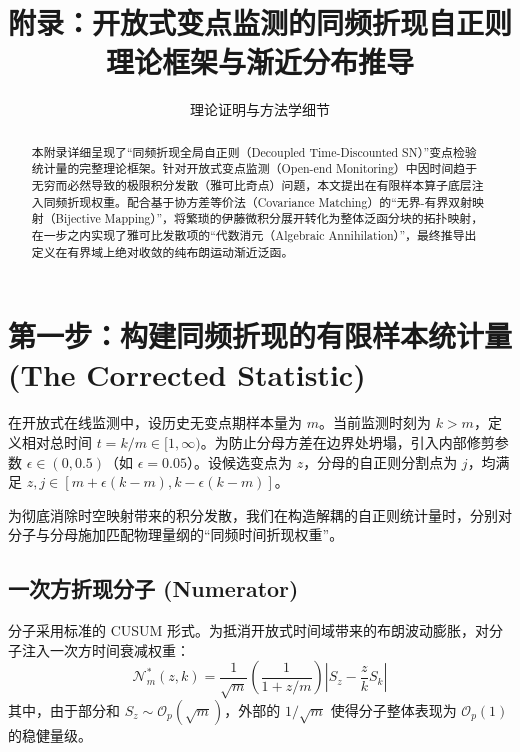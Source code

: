 \documentclass[11pt,a4paper]{article}
\title{\Large \textbf{附录：开放式变点监测的同频折现自正则理论框架与渐近分布推导}}
\author{理论证明与方法学细节}
\date{}
\begin{document}
\maketitle

\begin{abstract}
本附录详细呈现了“同频折现全局自正则（Decoupled Time-Discounted SN）”变点检验统计量的完整理论框架。针对开放式变点监测（Open-end Monitoring）中因时间趋于无穷而必然导致的极限积分发散（雅可比奇点）问题，本文提出在有限样本算子底层注入同频折现权重。配合基于协方差等价法（Covariance Matching）的“无界-有界双射映射（Bijective Mapping）”，将繁琐的伊藤微积分展开转化为整体泛函分块的拓扑映射，在一步之内实现了雅可比发散项的“代数消元（Algebraic Annihilation）”，最终推导出定义在有界域上绝对收敛的纯布朗运动渐近泛函。
\end{abstract}

\vspace{0.5cm}

\section{第一步：构建同频折现的有限样本统计量 (The Corrected Statistic)}

在开放式在线监测中，设历史无变点期样本量为 $m$。当前监测时刻为 $k > m$，定义相对总时间 $t = k/m \in [1, \infty)$。为防止分母方差在边界处坍塌，引入内部修剪参数 $\epsilon \in (0, 0.5)$（如 $\epsilon = 0.05$）。设候选变点为 $z$，分母的自正则分割点为 $j$，均满足 $z, j \in [m + \epsilon(k-m), k - \epsilon(k-m)]$。

为彻底消除时空映射带来的积分发散，我们在构造解耦的自正则统计量时，分别对分子与分母施加匹配物理量纲的“同频时间折现权重”。

\subsection{一次方折现分子 (Numerator)}
分子采用标准的 CUSUM 形式。为抵消开放式时间域带来的布朗波动膨胀，对分子注入一次方时间衰减权重：
\begin{equation}
\mathcal{N}^*_m(z, k) = \frac{1}{\sqrt{m}} \left( \frac{1}{1 + z/m} \right) \left| S_z - \frac{z}{k} S_k \right|
\end{equation}
其中，由于部分和 $S_z \sim \mathcal{O}_p(\sqrt{m})$，外部的 $1/\sqrt{m}$ 使得分子整体表现为 $\mathcal{O}_p(1)$ 的稳健量级。
\end{document}
